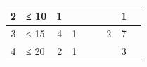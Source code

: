 \begin{table}
\begin{tabular}{
	c
	l
	r r c
	r r c
	r
}
2
	& ≤ 10
	& 1 %
	& %
	& %
	& %
	& %
	& 1 %
	\\

\midrule

3
	& ≤ 15
	& 4 %
	& 1 %
	& %
	& %
	& 2 %
	& 7 %
	\\

\midrule

4
	& ≤ 20
	& 2 %
	& 1 %
	& %
	& %
	& %
	& 3 %
	\\







\midrule


\end{tabular}
\end{table}
